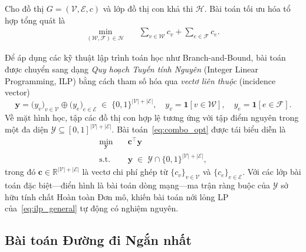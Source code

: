Cho đồ thị $G = (\mathcal{V}, \mathcal{E}, c)$ và lớp đồ thị con khả thi
$\mathcal{H}$. Bài toán tối ưu hóa tổ hợp tổng quát là
\begin{equation}
\begin{aligned}
    \min_{(\mathcal{W},\mathcal{F}) \in \mathcal{H}}
    \quad
    & \sum_{v \in \mathcal{W}} c_v
      +
      \sum_{e \in \mathcal{F}} c_e.
\end{aligned}
\label{eq:combo_opt}
\end{equation}

Để áp dụng các kỹ thuật lập trình toán học như Branch-and-Bound, bài toán được
chuyển sang dạng \emph{Quy hoạch Tuyến tính Nguyên}
(Integer Linear Programming, ILP) bằng cách tham số hóa qua
\emph{vectơ liên thuộc} (incidence vector)
\begin{equation}
    \mathbf{y}
    = \bigl(y_v\bigr)_{v \in \mathcal{V}}
      \oplus
      \bigl(y_e\bigr)_{e \in \mathcal{E}}
    \;\in\; \{0,1\}^{|\mathcal{V}|+|\mathcal{E}|},
    \quad
    y_v = \mathbf{1}[v \in \mathcal{W}],
    \quad
    y_e = \mathbf{1}[e \in \mathcal{F}].
\label{eq:incidence_vec}
\end{equation}
Về mặt hình học, tập các đồ thị con hợp lệ tương ứng với tập điểm nguyên trong
một đa diện $\mathcal{Y} \subseteq [0,1]^{|\mathcal{V}|+|\mathcal{E}|}$.
Bài toán~\eqref{eq:combo_opt} được tái biểu diễn là
\begin{equation}
\begin{aligned}
    \min_{\mathbf{y}} \quad
    & \mathbf{c}^{\top} \mathbf{y} \\
    \mathrm{s.t.} \quad
    & \mathbf{y} \;\in\; \mathcal{Y} \cap \{0,1\}^{|\mathcal{V}|+|\mathcal{E}|},
\end{aligned}
\label{eq:ilp_general}
\end{equation}
trong đó $\mathbf{c} \in \mathbb{R}^{|\mathcal{V}|+|\mathcal{E}|}$ là vectơ
chi phí ghép từ $\{c_v\}_{v \in \mathcal{V}}$ và $\{c_e\}_{e \in \mathcal{E}}$.
Với các lớp bài toán đặc biệt—điển hình là bài toán dòng mạng—ma trận ràng buộc
của $\mathcal{Y}$ sở hữu tính chất Hoàn toàn Đơn mô, khiến bài toán nới
lỏng LP của~\eqref{eq:ilp_general} tự động có nghiệm nguyên.

\subsection{Bài toán Đường đi Ngắn nhất}
\label{subsec:spp}

